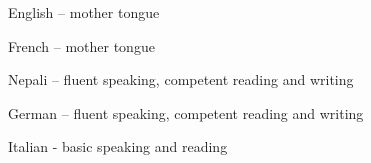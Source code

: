 


\begin{cvmemberships}
  \cvmembership
    {English -- mother tongue} %
    {} %

  \cvmembership
    {French -- mother tongue} %
    {} %

  \cvmembership
    {Nepali -- fluent speaking, competent reading and writing} %
    {} %

  \cvmembership
    {German -- fluent speaking, competent reading and writing} %
    {} %


  \cvmembership
    {Italian - basic speaking and reading} %
    {} %

\end{cvmemberships}
